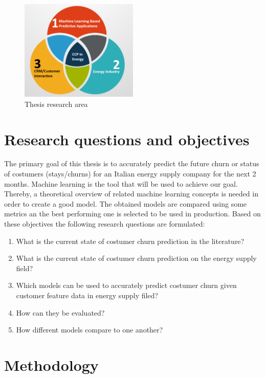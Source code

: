 \documentclass[LaM,binding=0.6cm, english]{sapthesis}
\begin{document}
\begin{figure}[!ht]
    \includegraphics[width=0.5\textwidth]{images/Thesis-Research-Area.png}
    \centering
    \caption{Thesis research area}
    \label{fig:research-area}
\end{figure}

\section{Research questions and objectives}

The primary goal of this thesis is to accurately predict the future churn or status of costumers (stays/churns) for an Italian energy supply company for the next 2 months. Machine learning is the tool that will be used to achieve our goal. Thereby, a theoretical overview of related machine learning concepts is needed in order to create a good model. The obtained models are compared using some metrics an the best performing one is selected to be used in production. Based on these objectives the following research questions are formulated:

\begin{enumerate}
	\item What is the current state of costumer churn prediction in the 			literature?
  	\item What is the current state of costumer churn prediction on the energy supply field?
  	\item Which models can be used to accurately predict costumer churn given customer feature data in energy supply filed?
  	\item How can they be evaluated?
  	\item How different models compare to one another?
\end{enumerate}

\section{Methodology}
\end{document}
